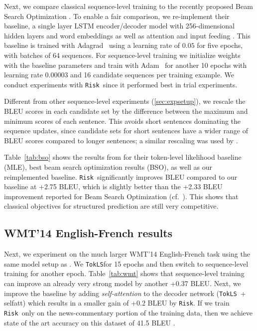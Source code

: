 \documentclass[11pt,a4paper]{article}
\newcommand{\TokLS}{\texttt{TokLS}}
\newcommand{\Risk}{\texttt{Risk}}
\begin{document}
Next, we compare classical sequence-level training to the recently proposed Beam Search Optimization \citep{wiseman2016acl}.
To enable a fair comparison, we re-implement their baseline, a single layer LSTM encoder/decoder model with 256-dimensional hidden layers and word embeddings as well as attention and input feeding \citep{luong2015effective}.
This baseline is trained with Adagrad~\citep{duchi2011adaptive} using a learning rate of $0.05$ for five epochs, with batches of 64 sequences.
For sequence-level training we initialize weights with the baseline parameters and train with Adam~\citep{kingma2014adam} for another 10 epochs with learning rate $0.00003$ and 16 candidate sequences per training example.
We conduct experiments with \Risk~since it performed best in trial experiments.

Different from other sequence-level experiments (\textsection\ref{sec:expsetup}), we rescale the BLEU scores in each candidate set by the difference between the maximum and minimum scores of each sentence.
This avoids short sentences dominating the sequence updates, since candidate sets for short sentences have a wider range of BLEU scores compared to longer sentences; a similar rescaling was used by \citet{bahdanau2016ac}.

Table~\ref{tab:bso} shows the results from \citet{wiseman2016acl} for their token-level likelihood baseline (MLE), best beam search optimization results (BSO), as well as our reimplemented baseline.
\Risk~significantly improves BLEU compared to our baseline at +2.75 BLEU, which is slightly better than the +2.33 BLEU improvement reported for Beam Search Optimization (cf.~\citet{wiseman2016acl}).
This shows that classical objectives for structured prediction are still very competitive.


\subsection{WMT’14 English-French results}

Next, we experiment on the much larger WMT'14 English-French task using the same model setup as \citet{gehring2017icml}.
We \TokLS for 15 epochs and then switch to sequence-level training for another epoch. 
Table~\ref{tab:wmt} shows that sequence-level training can improve an already very strong model by another +0.37 BLEU. 
Next, we improve the baseline by adding \emph{self-attention} \citep{paulus2017summary,vaswani2017transformer} to the decoder network (\TokLS~+ selfatt) which results in a smaller gain of +0.2 BLEU by \Risk.
If we train \Risk~only on the news-commentary portion of the training data, then we achieve state of the art accuracy on this dataset of 41.5 BLEU \citep{yingce2017deliberation}.
\end{document}
